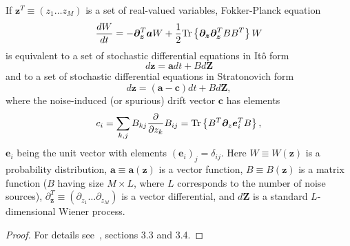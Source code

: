 \begin{lemma}
\label{lmm:wigner-bec:fpe:fpe-sde-real}
If $\bm{z}^T \equiv (z_1 \ldots z_M)$ is a set of real-valued variables,
Fokker-Planck equation
\[
	\frac{dW}{dt}
	= -\bm{\partial}_{\bm{z}}^T \bm{a} W
	+ \frac{1}{2} \mathrm{Tr} \left\{  \bm{\partial}_{\bm{z}} \bm{\partial}_{\bm{z}}^T B B^T  \right\} W
\]
is equivalent to a set of stochastic differential equations in It\^{o} form
\[
	d\bm{z} = \bm{a} dt + B d\bm{Z}
\]
and to a set of stochastic differential equations in Stratonovich form
\[
	d\bm{z} = (\bm{a} - \bm{c})dt + B d\bm{Z},
\]
where the noise-induced (or spurious) drift vector $\bm{c}$ has elements
\[
	c_i
	= \sum_{k,j} B_{kj} \frac{\partial}{\partial z_k} B_{ij}
	= \mathrm{Tr} \left\{ B^T \bm{\partial}_z \bm{e}_i^T B \right\},
\]
$\bm{e}_i$ being the unit vector with elements $(\bm{e}_i)_j = \delta_{ij}$.
Here $W \equiv W(\bm{z})$ is a probability distribution,
$\bm{a} \equiv \bm{a}(\bm{z})$ is a vector function,
$B \equiv B(\bm{z})$ is a matrix function ($B$ having size $M \times L$, where $L$ corresponds to the number of noise sources),
$\partial_{\bm{z}}^T \equiv (\partial_{z_1} \ldots \partial_{z_M})$ is a vector differential,
and $d\bm{Z}$ is a standard $L$-dimensional Wiener process.
\end{lemma}
\begin{proof}
For details see~\cite{Risken1996}, sections 3.3 and 3.4.
\end{proof}


